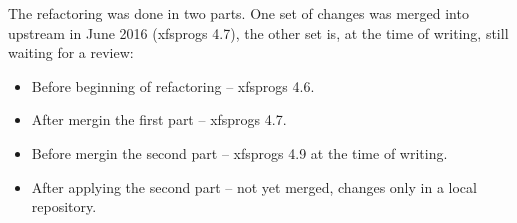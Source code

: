 The refactoring was done in two parts. One set of changes was merged into upstream in June 2016 (xfsprogs 4.7), the other set is, at the time of writing, still waiting for a review:
\begin{itemize}
\item Before beginning of refactoring -- xfsprogs 4.6.
\item After mergin the first part -- xfsprogs 4.7.
\item Before mergin the second part -- xfsprogs 4.9 at the time of writing.
\item After applying the second part -- not yet merged, changes only in a local repository.
\end{itemize}


